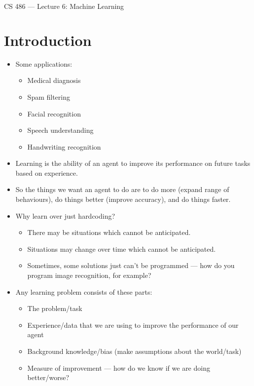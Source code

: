 \documentclass{article}
\author{Clement Tsang}
\begin{document}
\begin{center}
    \Large{CS 486 --- Lecture 6: Machine Learning}
\end{center}

\section{Introduction}
\begin{itemize}
    \item Some applications:
        \begin{itemize}
            \item Medical diagnosis
            \item Spam filtering
            \item Facial recognition
            \item Speech understanding
            \item Handwriting recognition
        \end{itemize}
    \item Learning is the ability of an agent to improve its performance on future tasks based on experience.
    \item So the things we want an agent to do are to do more (expand range of behaviours), do things better (improve accuracy), and do things faster.
    \item Why learn over just hardcoding?
        \begin{itemize}
            \item There may be situations which cannot be anticipated.
            \item Situations may change over time which cannot be anticipated.
            \item Sometimes, some solutions just can't be programmed --- how do you program image recognition, for example?
        \end{itemize}
    \item Any learning problem consists of these parts:
        \begin{itemize}
            \item The problem/task
            \item Experience/data that we are using to improve the performance of our agent
            \item Background knowledge/bias (make assumptions about the world/task)
            \item Measure of improvement --- how do we know if we are doing better/worse?
        \end{itemize}

\end{itemize}
\end{document}
